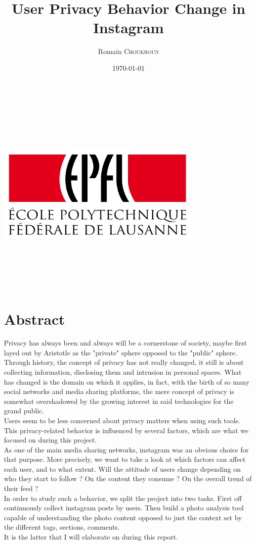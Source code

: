 \documentclass{article}
\title{\Huge User Privacy Behavior Change in Instagram}
\date{\today}
\author{Romain \textsc{Choukroun}}
\begin{document}
\begin{center}
      \includegraphics[width=10cm, height=10cm, keepaspectratio]{epfl.png}\\[\bigskipamount]
\end{center}
{\let\newpage\relax\maketitle}

\newpage
\tableofcontents

\newpage
\section{Abstract}
    Privacy has always been and always will be a cornerstone of society, maybe first layed out by Aristotle as the "private" sphere opposed to the "public" sphere. 
    \\Through history, the concept of privacy has not really changed, it still is about collecting information, disclosing them and intrusion in personal spaces. What has changed is the domain on which it applies, in fact, with the birth of so many social networks and media sharing platforms, the mere concept of privacy is somewhat overshadowed by the growing interest in said technologies for the grand public.
    \\Users seem to be less concerned about privacy matters when using such tools. This privacy-related behavior is influenced by several factors, which are what we focused on during this project.
    \\As one of the main media sharing networks, instagram was an obvious choice for that purpose. More precisely, we want to take a look at which factors can affect each user, and to what extent. Will the attitude of users change depending on who they start to follow ? On the content they consume ? On the overall trend of their feed ?
    \\In order to study such a behavior, we split the project into two tasks. First off continuously collect instagram posts by users. Then build a photo analysis tool capable of understanding the photo content opposed to just the context set by the different tags, sections, comments.
    \\It is the latter that I will elaborate on during this report.
\end{document}

